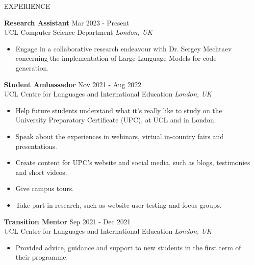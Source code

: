 \documentclass{resume} %
\begin{document}
\begin{rSection}{EXPERIENCE}

\textbf{Research Assistant} \hfill Mar 2023 - Present\\
UCL Computer Science Department \hfill \textit{London, UK}
\begin{itemize}
    \itemsep -3pt {} 
    \item Engage in a collaborative research endeavour with Dr. Sergey Mechtaev concerning the implementation of Large Language Models for code generation.
\end{itemize}

\textbf{Student Ambassador} \hfill Nov 2021 - Aug 2022\\
UCL Centre for Languages and International Education \hfill \textit{London, UK}
\begin{itemize}
    \itemsep -3pt {} 
    \item Help future students understand what it's really like to study on the University Preparatory Certificate (UPC), at UCL and in London.
    \item Speak about the experiences in webinars, virtual in-country fairs and presentations.
    \item Create content for UPC's website and social media, such as blogs, testimonies and short videos.
    \item Give campus tours.
    \item Take part in research, such as website user testing and focus groups.
\end{itemize}

\textbf{Transition Mentor} \hfill Sep 2021 - Dec 2021\\
UCL Centre for Languages and International Education \hfill \textit{London, UK}
\begin{itemize}
    \itemsep -3pt {} 
    \item Provided advice, guidance and support to new students in the first term of their programme.
\end{itemize}
 

\end{rSection}
\end{document}
